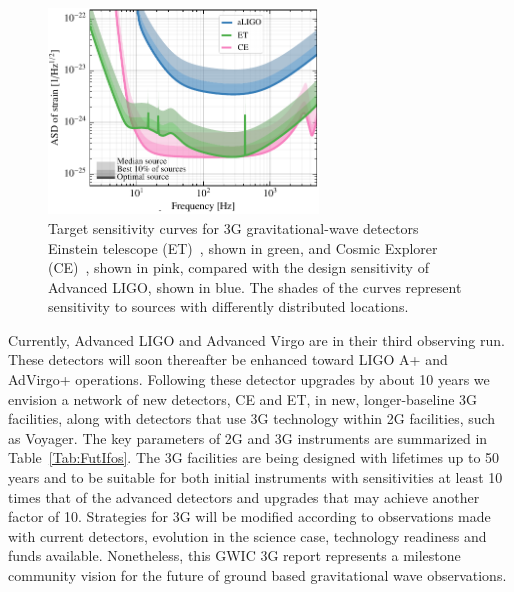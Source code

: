 \begin{figure}
\centering
\includegraphics*[width= 0.64\textwidth]{Figures/noises_percentiles-Voyager.pdf}
\caption{Target sensitivity curves for 3G gravitational-wave detectors Einstein telescope (ET)~\cite{ET2011}, shown in green, and Cosmic Explorer (CE)~\cite{CosmicExplorer2017}, shown in pink, compared with the design sensitivity of Advanced LIGO, shown in blue. 
The shades of the curves represent sensitivity to sources with differently distributed locations.}
\label{fig:3GSens}
\end{figure}

Currently, Advanced LIGO and Advanced Virgo are in their third observing run. These detectors will soon thereafter be enhanced toward LIGO A+ and AdVirgo+ operations. Following these detector upgrades by about 10 years we envision a network of new detectors, CE and ET, in new, longer-baseline 3G facilities, along with detectors that use 3G technology within 2G facilities, such as Voyager.
The key parameters of 2G and 3G instruments are summarized in Table~\ref{Tab:FutIfos}.
The 3G facilities are being designed with lifetimes up to 50 years and to be suitable for both initial instruments with sensitivities at least 10 times that of the advanced detectors and upgrades that may achieve another factor of 10.
Strategies for 3G will be modified according to observations made with current detectors, evolution in the science case, technology readiness and funds available. Nonetheless, this GWIC 3G report represents a milestone community vision for the future of ground based gravitational wave observations. 




